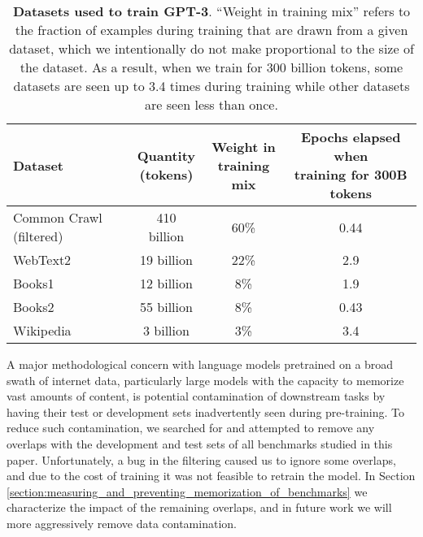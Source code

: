 \documentclass{article}
\begin{document}
\begin{table}

    \begin{center}
        \begin{tabular}{lccc}
        \toprule
        Dataset & \shortstack{Quantity \\ (tokens)} & \shortstack{Weight in \\training mix} & \shortstack{Epochs elapsed when \\ training for 300B tokens} \\ 
        \midrule
        Common Crawl (filtered) & 410 billion & 60\% & 0.44\\ 
        WebText2 & 19 billion & 22\% &  2.9 \\
        Books1 & 12 billion & 8\% & 1.9 \\ 
        Books2 & 55 billion & 8\% & 0.43 \\ 
        Wikipedia & 3 billion & 3\% & 3.4 \\ 
        \bottomrule
        \end{tabular}
    \end{center}
    \caption{\textbf{Datasets used to train GPT-3}.  ``Weight in training mix'' refers to the fraction of examples during training that are drawn from a given dataset, which we intentionally do not make proportional to the size of the dataset.  As a result, when we train for 300 billion tokens, some datasets are seen up to 3.4 times during training while other datasets are seen less than once.}
    \label{table:dataset}
\end{table} 
A major methodological concern with language models pretrained on a broad swath of internet data, particularly large models with the capacity to memorize vast amounts of content, is potential contamination of downstream tasks by having their test or development sets inadvertently seen during pre-training.  To reduce such contamination, we searched for and attempted to remove any overlaps with the development and test sets of all benchmarks studied in this paper.  Unfortunately, a bug in the filtering caused us to ignore some overlaps, and due to the cost of training it was not feasible to retrain the model. In Section \ref{section:measuring_and_preventing_memorization_of_benchmarks} we characterize the impact of the remaining overlaps, and in future work we will more aggressively remove data contamination.  
\end{document}
